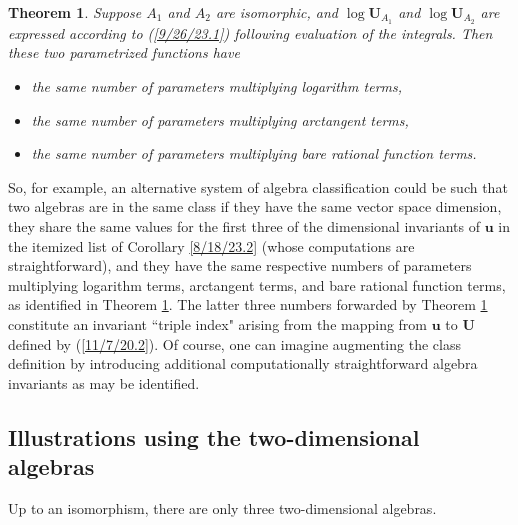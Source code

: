 \documentclass{amsart}
\numberwithin{equation}{section}
\newtheorem{theorem}{Theorem}
\theoremstyle{definition}
\numberwithin{theorem}{section}
\begin{document}
\enlargethispage{1cm}
\begin{theorem} \label{6/6/23.3} Suppose $A_1$ and $A_2$ are isomorphic, and $\log \mathbf{U}_{A_1}$ and $\log \mathbf{U}_{A_2}$ are expressed according to (\ref{9/26/23.1}) following evaluation of the integrals.  Then these two parametrized functions have
\begin{itemize} \item  the same number of parameters multiplying logarithm terms,  \item  the same number of parameters multiplying arctangent terms, 
 \item   the same number of parameters multiplying bare rational function terms. \end{itemize}
\end{theorem}


So, for example, an alternative system of algebra classification  could be such that two algebras are in the same class if they have the same vector space dimension, they share the same values for the first three of the dimensional invariants of $\mathbf{u}$ in the itemized list of Corollary \ref{8/18/23.2} (whose computations are straightforward), and they have the same respective numbers of parameters multiplying logarithm terms, arctangent terms, and bare rational function terms, as identified in Theorem \ref{6/6/23.3}.   The latter three numbers forwarded by Theorem \ref{6/6/23.3} constitute an invariant ``triple index" arising from the mapping from $\mathbf{u}$ to $\mathbf{U}$ defined by (\ref{11/7/20.2}).  
Of course, one can imagine augmenting the class definition by introducing additional computationally straightforward algebra invariants as may be identified.  

\subsection{Illustrations using the two-dimensional algebras}
Up to an isomorphism, there are only three two-dimensional algebras.
\end{document}
